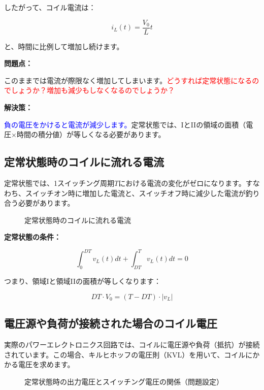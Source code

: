 したがって、コイル電流は：

\begin{equation}
i_L(t) = \frac{V_0}{L} t
\end{equation}

と、時間に比例して増加し続けます。

\textbf{問題点：}

このままでは電流が際限なく増加してしまいます。\textcolor{red}{どうすれば定常状態になるのでしょうか？増加も減少もしなくなるのでしょうか？}

\textbf{解決策：}

\textcolor{blue}{負の電圧をかけると電流が減少します。}定常状態では、IとIIの領域の面積（電圧×時間の積分値）が等しくなる必要があります。

\subsection{定常状態時のコイルに流れる電流}

定常状態では、1スイッチング周期$T$における電流の変化がゼロになります。すなわち、スイッチオン時に増加した電流と、スイッチオフ時に減少した電流が釣り合う必要があります。

\begin{figure}[H]
\centering
{}
\caption{定常状態時のコイルに流れる電流}
\label{fig:ch04_inductor_steady}
\end{figure}

\textbf{定常状態の条件：}

\begin{equation}
\int_0^{DT} v_L(t)dt + \int_{DT}^{T} v_L(t)dt = 0
\end{equation}

つまり、領域Iと領域IIの面積が等しくなります：

\begin{equation}
DT \cdot V_0 = (T - DT) \cdot |v_L|
\end{equation}

\subsection{電圧源や負荷が接続された場合のコイル電圧}

実際のパワーエレクトロニクス回路では、コイルに電圧源や負荷（抵抗）が接続されています。この場合、キルヒホッフの電圧則（KVL）を用いて、コイルにかかる電圧を求めます。

\begin{figure}[H]
\centering
{}
\caption{定常状態時の出力電圧とスイッチング電圧の関係（問題設定）}
\label{fig:ch04_inductor_load_problem}
\end{figure}

